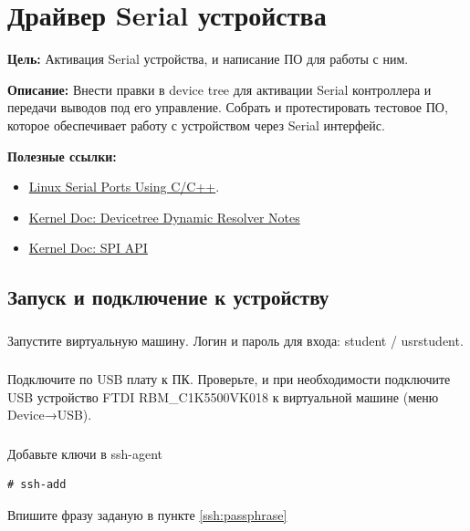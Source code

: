 \chapter{Драйвер Serial устройства}
\textbf{Цель:} Активация Serial устройства, и написание ПО для работы с ним.

\vspace{5mm}
\textbf{Описание:} Внести правки в device tree для активации Serial контроллера и передачи выводов под его управление. Собрать и протестировать тестовое ПО, которое обеспечивает работу с устройством через Serial интерфейс.

\vspace{5mm}
\textbf{Полезные ссылки:}
\begin{itemize}
	\item \href{https://blog.mbedded.ninja/programming/operating-systems/linux/linux-serial-ports-using-c-cpp/}{Linux Serial Ports Using C/C++}.
	\item \href{https://docs.kernel.org/devicetree/dynamic-resolution-notes.html}{Kernel Doc: Devicetree Dynamic Resolver Notes}
	\item \href{https://www.kernel.org/doc/html/v4.15/driver-api/spi.html}{Kernel Doc: SPI API}	
\end{itemize}

\section{Запуск и подключение к устройству}

\subsection{}Запустите виртуальную машину. Логин и пароль для входа: student / usrstudent.

\subsection{}Подключите по USB плату к ПК. Проверьте, и при необходимости подключите USB устройство FTDI RBM\_C1K5500VK018 к виртуальной машине (меню Device→USB).

\subsection{}Добавьте ключи в ssh-agent
\begin{lstlisting}[style=bash]
# ssh-add
\end{lstlisting}
Впишите фразу заданую в пункте \ref{ssh:passphrase}

